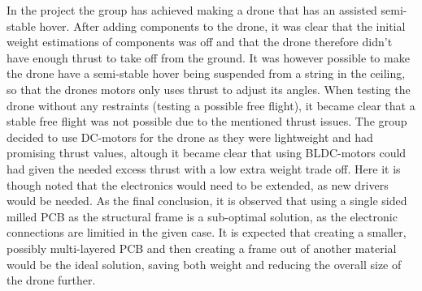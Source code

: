 In the project the group has achieved making a drone that has an assisted semi-stable hover. After adding components to the drone, it was clear that the initial weight estimations of components was off and that the drone therefore didn't have enough thrust to take off from the ground. 
It was however possible to make the drone have a semi-stable hover being suspended from a string in the ceiling, so that the drones motors only uses thrust to adjust its angles. When testing the drone without any restraints (testing a possible free flight), it became clear that a stable free flight was not possible due to the mentioned thrust issues. The group decided to use DC-motors for the drone as they were lightweight and had promising thrust values, altough it became clear that using BLDC-motors could had given the needed excess thrust with a low extra weight trade off. Here it is though noted that the electronics would need to be extended, as new drivers would be needed. As the final conclusion, it is observed that using a single sided milled PCB as the structural frame is a sub-optimal solution, as the electronic connections are limitied in the given case. It is expected that creating a smaller, possibly multi-layered PCB and then creating a frame out of another material would be the ideal solution, saving both weight and reducing the overall size of the drone further.

